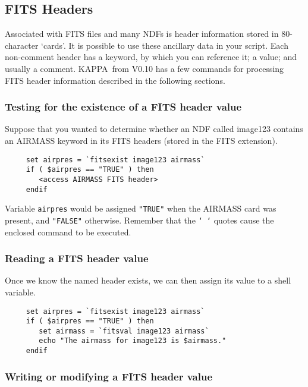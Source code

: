 \documentclass[twoside,11pt]{article}
\newcommand{\htmlref}[2]{#1}
\newcommand{\xref}[3]{#1}
\newcommand{\xlabel}[1]{}
\newcommand{\KAPPAref}{\xref{{\footnotesize KAPPA}}{sun95}{}}
\newcommand{\NDFref}[1]{\xref{#1}{sun33}{}}
\begin{document}
\newpage
\subsection{\xlabel{sc4_se_FITS_headers}FITS Headers\label{sc4_se_FITS_headers}}

Associated with \htmlref{{\sf FITS}}{sc4_gl_fits} files and many
\NDFref{{\sf NDF}s} is header information stored in 80-character
`cards'.  It is possible to use these ancillary data in your script.
Each non-comment header has a keyword, by which you can reference it;
a value; and usually a comment.  \KAPPAref\ from V0.10 has a few
commands for processing {\sf FITS} header information described in the
following sections.

\subsubsection{Testing for the existence of a FITS header value}

Suppose that you wanted to determine whether an NDF called image123
contains an AIRMASS keyword in its \htmlref{{\sf FITS}}{sc4_gl_fits}
headers (stored in the FITS extension).

\small
\begin{verbatim}
     set airpres = `fitsexist image123 airmass`
     if ( $airpres == "TRUE" ) then
        <access AIRMASS FITS header>
     endif
\end{verbatim}
\normalsize
Variable {\tt airpres} would be assigned {\tt "TRUE"} when the AIRMASS
card was present, and {\tt "FALSE"} otherwise.  Remember that the
{\tt `~`} quotes cause the enclosed command to be executed.

\subsubsection{Reading a FITS header value}

Once we know the named header exists, we can then assign its value
to a \htmlref{shell variable}{sc4_se_variables}.

\small
\begin{verbatim}
     set airpres = `fitsexist image123 airmass`
     if ( $airpres == "TRUE" ) then
        set airmass = `fitsval image123 airmass`
        echo "The airmass for image123 is $airmass."
     endif
\end{verbatim}
\normalsize

\subsubsection{Writing or modifying a FITS header value}
\end{document}
